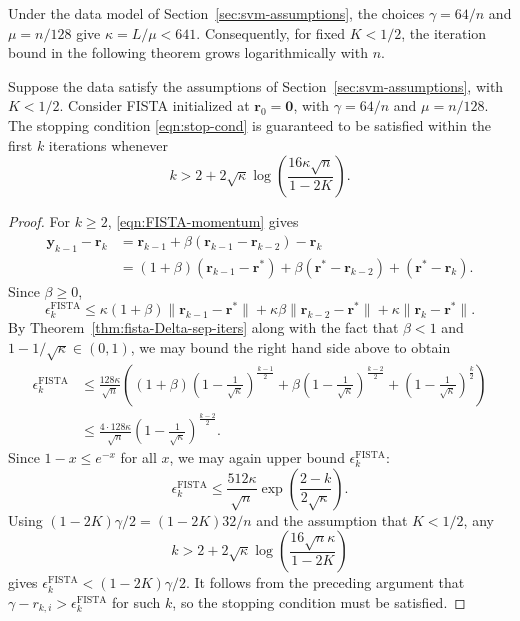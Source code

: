 \documentclass[twoside,11pt]{article}
\newcommand\bz{\bm{0}}
\renewcommand\r{\bm{r}}
\newcommand\y{\bm{y}}
\newcommand\FISTA{\mathrm{FISTA}}
\begin{document}
Under the data model of Section~\ref{sec:svm-assumptions}, the choices $\gamma=64/n$ and $\mu=n/128$ give $\kappa = L/\mu < 641$. Consequently, for fixed $K < 1/2$, the iteration bound in the following theorem grows logarithmically with \(n\).
\begin{theorem} \label{thm:stop-cond-iter-complexity}
    Suppose the data satisfy the assumptions of Section~\ref{sec:svm-assumptions}, with $K < 1/2$. Consider FISTA initialized at $\r_0 = \bz$, with $\gamma = 64/n$ and $\mu = n/128$. The stopping condition \eqref{eqn:stop-cond} is guaranteed to be satisfied within the first $k$ iterations whenever
    \[
        k > 2 + 2\sqrt{\kappa}\log\left(\frac{16\kappa\sqrt{n}}{1-2K}\right).
    \]
\end{theorem}
\begin{proof}
    For $k \geq 2$, \eqref{eqn:FISTA-momentum} gives
    \begin{align*}
        \y_{k-1} - \r_k &= \r_{k-1} + \beta(\r_{k-1} - \r_{k-2}) - \r_k\\
                        &= (1+\beta)(\r_{k-1} - \r^*) + \beta(\r^* - \r_{k-2}) + (\r^* - \r_k).
    \end{align*}
    Since $\beta \geq 0$,
    \[
        \epsilon_k^{\FISTA} \leq \kappa(1+\beta)\|\r_{k-1} - \r^*\| + \kappa\beta\|\r_{k-2} - \r^*\| + \kappa\|\r_k - \r^*\|.
    \]
    By Theorem~\ref{thm:fista-Delta-sep-iters} along with the fact that $\beta < 1$ and $1-1/\sqrt{\kappa} \in (0,1)$, we may bound the right hand side above to obtain 
    \begin{align*}
        \epsilon_k^{\FISTA} &\leq \frac{128\kappa}{\sqrt{n}}\left((1+\beta)\left(1-\frac{1}{\sqrt{\kappa}}\right)^{\frac{k-1}{2}} + \beta\left(1-\frac{1}{\sqrt{\kappa}}\right)^{\frac{k-2}{2}} + \left(1-\frac{1}{\sqrt{\kappa}}\right)^{\frac{k}{2}}\right)\\
                            &\leq \frac{4\cdot 128\kappa}{\sqrt{n}}\left(1-\frac{1}{\sqrt{\kappa}}\right)^{\frac{k-2}{2}}.
    \end{align*}
    Since $1 - x \leq e^{-x}$ for all $x$, we may again upper bound $\epsilon_k^{\FISTA}$:
    \[
        \epsilon_k^{\FISTA} \leq \frac{512\kappa}{\sqrt{n}}\exp\left(\frac{2-k}{2\sqrt{\kappa}}\right).
    \]
    Using $(1-2K)\gamma/2 = (1-2K)32/n$ and the assumption that $K < 1/2$, any
    \[
        k > 2 + 2\sqrt{\kappa}\log\left(\frac{16\sqrt{n}\kappa}{1-2K}\right)
    \]
    gives $\epsilon_k^{\FISTA} < (1-2K)\gamma/2$. It follows from the preceding argument that $\gamma - r_{k,i} > \epsilon_k^{\FISTA}$ for such $k$, so the stopping condition must be satisfied.
\end{proof}
\end{document}
